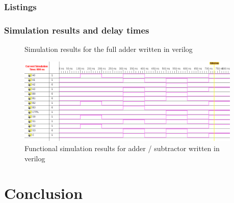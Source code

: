 \documentclass[11pt]{article}
\begin{document}
\subsubsection{Listings}



\subsubsection{Simulation results and delay times}
\begin{figure}[htpb]
	\centering
	\caption{Simulation results for the full adder written in verilog}
	\label{fig:FA_verilog}
\end{figure}

\begin{figure}[htpb]
	\centering
	\includegraphics[width=0.95\textwidth]{add_sub_test_verilog}
	\caption{Functional simulation results for adder / subtractor written in verilog}
	\label{fig:AS_verilog}
\end{figure}

\section{Conclusion}
\end{document}
